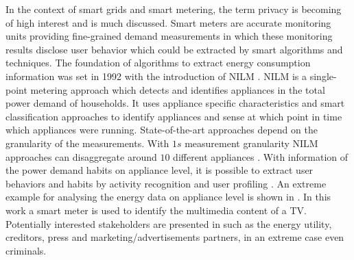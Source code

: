 \documentclass{article}
\begin{document}
In the context of smart grids and smart metering, the term privacy is becoming of high interest and is much discussed. 
Smart meters are accurate monitoring units providing fine-grained demand measurements in which these monitoring results disclose user behavior which could be extracted by smart algorithms and techniques.
The foundation of algorithms to extract energy consumption information was set in 1992 with the introduction of \ac{NILM} \cite{Hart1992}.
\ac{NILM} is a single-point metering approach which detects and identifies appliances in the total power demand of households.
It uses appliance specific characteristics and smart classification approaches to  identify appliances and sense at which point in time which appliances were running.
State-of-the-art approaches \cite{Zeifman2011, Egarter2013BuildSys} depend on the granularity of the measurements.
With $1s$ measurement granularity \ac{NILM} approaches can disaggregate around $10$ different appliances \cite{CarrieArmel2013}.
With information of the power demand habits on appliance level, it is possible to extract user behaviors and habits by activity recognition and user profiling \cite{Nguyen2013244,Lisovich2010}.
An extreme example for analysing the energy data on appliance level is shown in \cite{Greveler2012}. 
In this work a smart meter is used to identify the multimedia content of a TV.
Potentially interested stakeholders are presented in \cite{Skopik} such as the energy utility, creditors, press and marketing/advertisements partners, in an extreme case even criminals.
\end{document}
